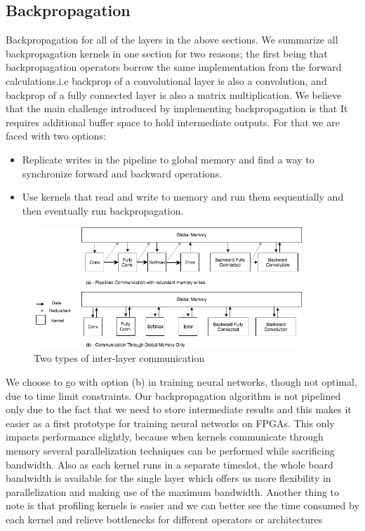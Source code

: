 \subsection{Backpropagation}

Backpropagation for all of the layers in the above sections. We summarize all backpropagation kernels in one section for two reasons; the first being that backpropagation operators borrow the same implementation from the forward calculations.i.e backprop of a convolutional layer is also a convolution, and backprop of a fully connected layer is also a matrix multiplication. We believe that the main challenge introduced by implementing backpropagation is that It requires additional buffer space to hold intermediate outputs. For that we are faced with two options:
\begin{itemize}
\item
Replicate writes in the pipeline to global memory and find a way to synchronize forward and backward operations.
\item
Use kernels that read and write to memory and run them sequentially and then eventually run backpropagation.
\end{itemize}

\begin{figure}[h]
\centering
\includegraphics[width=0.9\textwidth]{Figures/comm}
\caption[Types of inter-layer communication]{ Two types of inter-layer communication }
\label{fig:comm}
\end{figure}

We choose to go with option (b) in training neural networks, though not optimal, due to time limit constraints. Our backpropagation algorithm is not pipelined only due to the fact that we need to store intermediate results and this makes it easier as a first prototype for training neural networks on FPGAs. This only impacts performance slightly, because when kernels communicate through memory several parallelization techniques can be performed while sacrificing bandwidth. Also as each kernel runs in a separate timeslot, the whole board bandwidth is available for the single layer which offers us more flexibility in parallelization and making use of the maximum bandwidth. Another thing to note is that profiling kernels is easier and we can better see the time consumed by each kernel and relieve bottlenecks for different operators or architectures 

